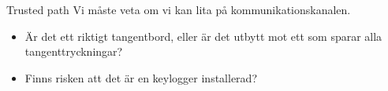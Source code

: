 \documentclass{beamer}
\begin{document}

\begin{frame}
  \begin{block}{Trusted path}
    Vi måste veta om vi kan lita på kommunikationskanalen.
  \end{block}

  \pause{}

  \begin{example}
    \begin{itemize}
      \item Är det ett riktigt tangentbord, eller är det utbytt mot ett som 
        sparar alla tangenttryckningar?
      \item Finns risken att det är en keylogger installerad?
    \end{itemize}
  \end{example}
\end{frame}
\end{document}
